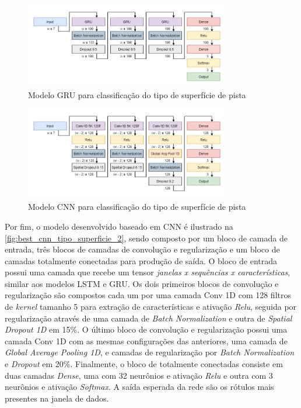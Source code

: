 \begin{figure}[h!]
  \centering
  \caption{Modelo GRU para classificação do tipo de superfície de pista}
  \label{fig:best_gru_tipo_superficie_2}
  \includegraphics[width=0.8\textwidth]{figuras/fig_38.png}
\end{figure}

\begin{figure}[h!]
  \centering
  \caption{Modelo CNN para classificação do tipo de superfície de pista}
  \label{fig:best_cnn_tipo_superficie_2}
  \includegraphics[width=0.8\textwidth]{figuras/fig_39.png}
\end{figure}

Por fim, o modelo desenvolvido baseado em CNN é ilustrado na \autoref{fig:best_cnn_tipo_superficie_2}, sendo composto por um bloco de camada de entrada, três blocos de camadas de convolução e regularização e um bloco de camadas totalmente conectadas para produção de saída. O bloco de entrada possui uma camada que recebe um tensor \emph{janelas x sequências x características}, similar aos modelos LSTM e GRU. Os dois primeiros blocos de convolução e regularização são compostos cada um por uma camada Conv 1D com 128 filtros de \textit{kernel} tamanho 5 para extração de características e ativação \textit{Relu}, seguida por regularização através de uma camada de \textit{Batch Normalization} e outra de \textit{Spatial Dropout 1D} em 15\%. O último bloco de convolução e regularização possui uma camada Conv 1D com as mesmas configurações das anteriores, uma camada de \textit{Global Average Pooling 1D}, e camadas de regularização por \textit{Batch Normalization} e \textit{Dropout} em 20\%. Finalmente, o bloco de totalmente conectadas consiste em duas camadas \textit{Dense}, uma com 32 neurônios e ativação \textit{Relu} e outra com 3 neurônios e ativação \textit{Softmax}. A saída esperada da rede são os rótulos mais presentes na janela de dados.

